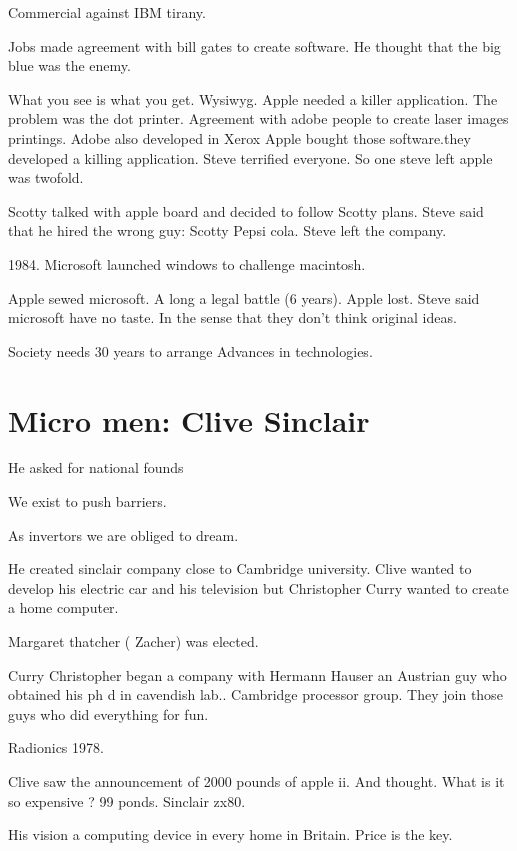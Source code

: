   Commercial against IBM tirany. 
  
  Jobs made agreement with bill gates to create software. He thought that the big blue was the enemy. 
  
  
  What you see is what you get. 
  Wysiwyg. Apple needed a killer application. 
  The problem was the dot printer. Agreement with adobe people to create laser images printings. 
  Adobe also developed in Xerox 
  Apple bought those software.they developed a killing application. Steve terrified everyone. So one steve left apple was twofold. 
  
  Scotty talked with apple board and decided to follow Scotty plans. 
  Steve said that he hired the wrong guy: Scotty Pepsi cola.  Steve left the company. 
  
  1984. Microsoft launched windows to challenge macintosh.  
  
  Apple sewed microsoft. A long a legal battle (6 years). 
   Apple lost. 
  Steve said microsoft have no taste. 
  In the sense that they don't think original ideas. 
  
  Society needs 30 years to arrange Advances in technologies. 
  
  
  
   
   \section{Micro men: Clive Sinclair} 
   
   He asked for national founds
   
   We exist to push barriers. 
   
   As invertors we are obliged to dream. 
   
   He created sinclair company close to Cambridge university. 
   Clive wanted to develop his electric car and his television but Christopher Curry wanted to create a home computer. 
   
   Margaret thatcher ( Zacher) was elected. 
   
   Curry Christopher began a company with Hermann Hauser an Austrian guy who obtained his ph d in cavendish lab..  Cambridge processor group. 
   They join those guys who did everything for fun. 
   
   Radionics 1978. 
   
   Clive saw the announcement of 2000 pounds of apple ii. And thought. What is it so expensive ? 
   99 ponds. Sinclair zx80. 
   
   His vision a computing device in every home in Britain. Price is the key. 
   
